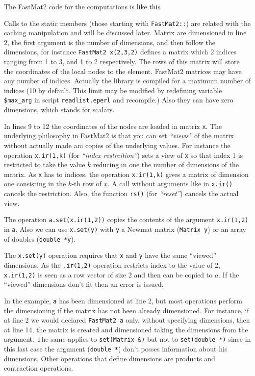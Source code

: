 The FastMat2 code for the computations is like this


Calls to the static members (those starting with \verb+FastMat2::+)
are related with the caching manipulation and will be discussed
later. Matrix are dimensioned in line 2, the first argument is the
number of dimensions, and then follow the dimensions, for instance
\verb+FastMat2 x(2,3,2)+ defines a matrix which 2 indices ranging from
1 to 3, and 1 to 2 respectively. The rows of this matrix will store
the coordinates of the local nodes to the element. FastMat2 matrices
may have any number of indices. Actually the library is compiled for a
maximum number of indices (10 by default. This limit may be modified
by redefining variable {\tt\$max\_arg} in script \verb+readlist.eperl+
and recompile.) Also they can have zero dimensions, which stands for
scalars. 

In lines 9 to 12 the coordinates of the nodes are
loaded in matrix \verb+x+. The underlying philosophy in FastMat2 is
that you can set \emph{``views''} of the matrix without actually made
ani copies of the underlying values. For instance the operation
\verb+x.ir(1,k)+ (for \emph{``index restrcition''}) sets a view of
\verb+x+ so that index 1 is restricted to take the value $k$ reducing
in one the number of dimensions of the matrix. As \verb+x+ has to
indices, the operation \verb+x.ir(1,k)+ gives a matrix of dimension
one consisting in the $k$-th row of $x$. A call without arguments like
in \verb+x.ir()+ cancels the restriction. Also, the function \verb+rs()+
(for \emph{``reset''}) cancels the actual view. 

The operation \verb+a.set(x.ir(1,2))+ copies the contents of the
argument \verb+x.ir(1,2)+ in \verb+a+. Also we can use \verb+x.set(y)+
with \verb+y+ a Newmat matrix (\verb+Matrix y+) or an array of doubles
(\verb+double *y+). 

 The \verb+x.set(y)+ operation requires
that \verb+x+ and \verb+y+ have the same ``viewed'' dimensions.  As the
\verb+.ir(1,2)+ operation restricts index to the value of 2,
\verb+x.ir(1,2)+ is seen as a row vector of size 2 and then can be
copied to $a$. If the ``viewed'' dimensions don't fit then an error is
issued.

In the example, \verb+a+ has been dimensioned at line
2, but most operations perform the dimensioning if the matrix has not
been already dimensioned. For instance, if at line 2 we would declared
\verb+FastMat2 a+ only, without specifying dimensions, then at line
14, the matrix is created and dimensioned taking the dimensions from
the argument. The same applies to \verb+set(Matrix &)+ but not to
\verb+set(double *)+ since in this last case the argument
(\verb+double *+) don't posses information about his dimensions. Other
operations that define dimensions are products and contraction
operations. 

